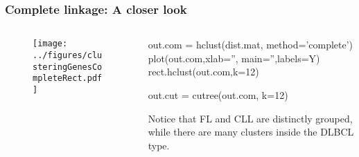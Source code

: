 \documentclass{beamer}
\begin{document}
\begin{frame}[fragile]
\frametitle{Complete linkage: A closer look}
\begin{columns}[T]
\begin{column}{.55\textwidth}
\begin{figure}
\centering
  \texttt{[image: ../figures/clusteringGenesCompleteRect.pdf]} 
\end{figure}
\end{column}
\begin{column}{.45\textwidth} 
\vsp
\vsp
\vsp

\begin{blockcode}
out.com = hclust(dist.mat,
     method='complete')
plot(out.com,xlab='',
   main='',labels=Y)
rect.hclust(out.com,k=12)

out.cut = cutree(out.com,
         k=12)
\end{blockcode}
Notice that FL and CLL are distinctly grouped, while there are many clusters inside the DLBCL type.
\end{column}
\end{columns}
\end{frame}
%
%
%
%
\end{document}
